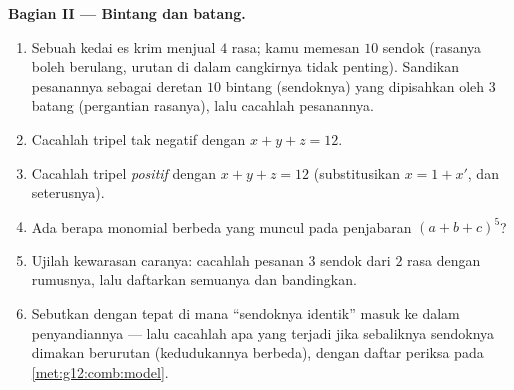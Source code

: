 \begin{problem}
\medskip
\noindent\textbf{Bagian II --- Bintang dan batang.}
\begin{enumerate}[resume]
  \item Sebuah kedai es krim menjual $4$ rasa; kamu memesan $10$
        sendok (rasanya boleh berulang, urutan di dalam cangkirnya
        tidak penting). Sandikan pesanannya sebagai deretan $10$ bintang
        (sendoknya) yang dipisahkan oleh $3$ batang (pergantian rasanya), lalu
        cacahlah pesanannya.
  \item Cacahlah tripel  tak negatif dengan
        $x + y + z = 12$.
  \item Cacahlah tripel  \emph{positif} dengan
        $x + y + z = 12$ (substitusikan $x = 1 + x'$, dan seterusnya).
  \item Ada berapa monomial berbeda yang muncul pada penjabaran
        $(a + b + c)^5$?
  \item Ujilah kewarasan caranya: cacahlah pesanan $3$
        sendok dari $2$ rasa dengan rumusnya, lalu daftarkan
        semuanya dan bandingkan.
  \item Sebutkan dengan tepat di mana ``sendoknya identik'' masuk ke dalam
        penyandiannya --- lalu cacahlah apa yang terjadi jika sebaliknya
        sendoknya dimakan berurutan (kedudukannya berbeda), dengan
        daftar periksa pada \cref{met:g12:comb:model}.
\end{enumerate}


\end{problem}
